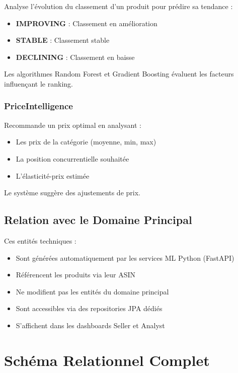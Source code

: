 \documentclass[12pt,a4paper]{report}
\begin{document}
Analyse l'évolution du classement d'un produit pour prédire sa tendance :
\begin{itemize}[noitemsep]
    \item \textbf{IMPROVING} : Classement en amélioration
    \item \textbf{STABLE} : Classement stable
    \item \textbf{DECLINING} : Classement en baisse
\end{itemize}

Les algorithmes Random Forest et Gradient Boosting évaluent les facteurs influençant le ranking.

\subsubsection{PriceIntelligence}

Recommande un prix optimal en analysant :
\begin{itemize}[noitemsep]
    \item Les prix de la catégorie (moyenne, min, max)
    \item La position concurrentielle souhaitée
    \item L'élasticité-prix estimée
\end{itemize}

Le système suggère des ajustements de prix.

\subsection{Relation avec le Domaine Principal}

Ces entités techniques :
\begin{itemize}[noitemsep]
    \item Sont générées automatiquement par les services ML Python (FastAPI)
    \item Référencent les produits via leur ASIN
    \item Ne modifient pas les entités du domaine principal
    \item Sont accessibles via des repositories JPA dédiés
    \item S'affichent dans les dashboards Seller et Analyst
\end{itemize}

\section{Schéma Relationnel Complet}
\end{document}
